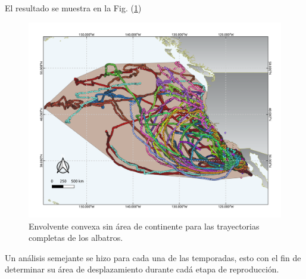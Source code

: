 El resultado se muestra en la Fig. (\ref{fig:differenceFullConvexHull})

\begin{figure}[h]
    \centering
    \includegraphics[scale=0.60]{figures/differenceFullConvexHull.png}
    \caption{Envolvente convexa sin área de continente para las trayectorias
    completas de los albatros.}
    \label{fig:differenceFullConvexHull}
\end{figure}


Un análisis semejante se hizo para cada una de las temporadas, esto con el fin
de determinar su área de desplazamiento durante cadá etapa de reproducción.



